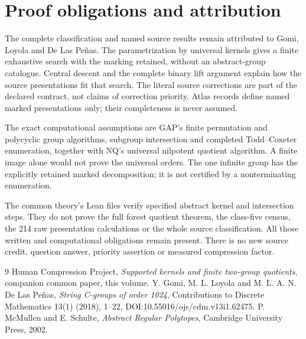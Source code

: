 \section{Proof obligations and attribution}
The complete classification and named source results remain attributed
to Gomi, Loyola and De Las Pe\~nas. The parametrization by universal kernels gives a finite exhaustive
search with the marking retained, without an abstract-group catalogue. Central descent and the complete binary lift
argument explain how the source presentations fit that search. The
literal source corrections are part of the declared contract, not
claims of correction priority. Atlas records define named marked
presentations only; their completeness is never assumed.

The exact computational assumptions are GAP's finite permutation and
polycyclic group algorithms, subgroup intersection and completed
Todd--Coxeter enumeration, together with NQ's universal nilpotent
quotient algorithm. A finite image alone would not prove the universal
orders. The one infinite group has the explicitly retained marked
decomposition; it is not certified by a nonterminating enumeration.

The common theory's Lean files verify specified abstract kernel and
intersection steps. They do not prove the full forest quotient theorem,
the class-five census, the 214 raw presentation calculations or the
whole source classification. All those written and computational
obligations remain present. There is no new source credit, question
answer, priority assertion or measured compression factor.

\begin{thebibliography}{9}
 Human Compression Project, \emph{Supported kernels and
finite two-group quotients}, companion common paper, this volume.
 Y. Gomi, M. L. Loyola and M. L. A. N. De Las Pe\~nas,
\emph{String C-groups of order 1024}, Contributions to Discrete
Mathematics 13(1) (2018), 1--22, DOI:10.55016/ojs/cdm.v13i1.62475.
 P. McMullen and E. Schulte, \emph{Abstract Regular
Polytopes}, Cambridge University Press, 2002.
\end{thebibliography}


